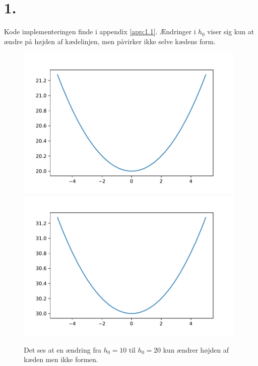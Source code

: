 \section*{1.}
Kode implementeringen finde i appendix \ref{app:1.1}.
% 
Ændringer i $h_0$ viser sig kun at ændre på højden af kædelinjen, men påvirker ikke selve kædens form. 
%
\begin{figure}[h!]
\includegraphics[scale=0.5]{code/fig1}
\includegraphics[scale=0.5]{code/fig2}
\caption{Det ses at en ændring fra $h_0=10$ til $h_0=20$ kun ændrer højden af kæden men ikke formen.}
\end{figure}
%
